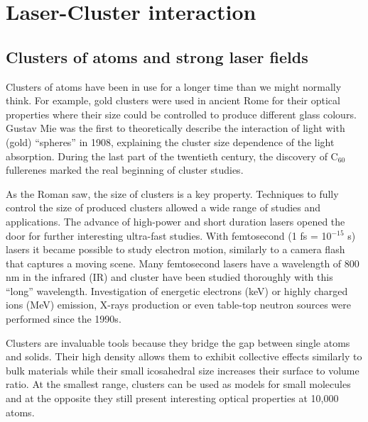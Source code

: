 
\section{Laser-Cluster interaction}

\subsection{Clusters of atoms and strong laser fields}
Clusters of atoms have been in use for a longer time than we might normally
think. For example, gold clusters were used in ancient Rome for their optical
properties where their size could be controlled to produce different glass colours.
Gustav Mie was the first to theoretically describe the interaction of light
with (gold) ``spheres'' in 1908, explaining the cluster size dependence of the
light absorption. During the last part of the twentieth century, the discovery of
C$_{60}$ fullerenes marked the real beginning of cluster studies.

As the Roman saw, the size of clusters is a key property. Techniques to fully
control the size of produced clusters allowed a wide range of studies and
applications. The advance of high-power and short duration lasers opened the
door for further interesting ultra-fast studies. With femtosecond
(1 fs = 10$^{-15}$ s) lasers it became possible to study electron motion,
similarly to a camera flash that captures a moving scene. Many femtosecond lasers
have a wavelength of 800 nm in the infrared (IR) and cluster have been studied
thoroughly with this ``long'' wavelength. Investigation of energetic
electrons (keV) or highly charged ions (MeV) emission, X-rays production or even
table-top neutron sources were performed since the 1990s\cite{Haberland1994,Brabec2009}.

Clusters are invaluable tools because they bridge the gap between single atoms
and solids. Their high density allows them to exhibit collective effects similarly
to bulk materials while their small icosahedral\cite{Martin1996} size increases
their surface to volume ratio.
At the smallest range, clusters can be used as models for small molecules and
at the opposite they still present interesting optical properties at 10,000
atoms\cite{Reinhard2004}.

